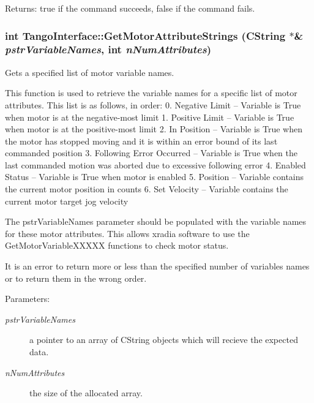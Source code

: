\begin{Desc}
\item[Returns:]true if the command succeeds, false if the command fails. \end{Desc}
\hypertarget{classTangoInterface_78ab845a344c3d140cbeef3da653ca29}{
\subsubsection[GetMotorAttributeStrings]{\setlength{\rightskip}{0pt plus 5cm}int TangoInterface::GetMotorAttributeStrings (CString $\ast$\& {\em pstrVariableNames}, \/  int {\em nNumAttributes})}}
\label{classTangoInterface_78ab845a344c3d140cbeef3da653ca29}


Gets a specified list of motor variable names. 

This function is used to retrieve the variable names for a specific list of motor attributes. This list is as follows, in order: 0. Negative Limit -- Variable is True when motor is at the negative-most limit 1. Positive Limit -- Variable is True when motor is at the positive-most limit 2. In Position -- Variable is True when the motor has stopped moving and it is within an error bound of its last commanded position 3. Following Error Occurred -- Variable is True when the last commanded motion was aborted due to excessive following error 4. Enabled Status -- Variable is True when motor is enabled 5. Position -- Variable contains the current motor position in counts 6. Set Velocity -- Variable contains the current motor target jog velocity

The pstrVariableNames parameter should be populated with the variable names for these motor attributes. This allows xradia software to use the GetMotorVariableXXXXX functions to check motor status.

It is an error to return more or less than the specified number of variables names or to return them in the wrong order.

\begin{Desc}
\item[Parameters:]
\begin{description}
\item[{\em pstrVariableNames}]a pointer to an array of CString objects which will recieve the expected data. \item[{\em nNumAttributes}]the size of the allocated array. \end{description}
\end{Desc}


